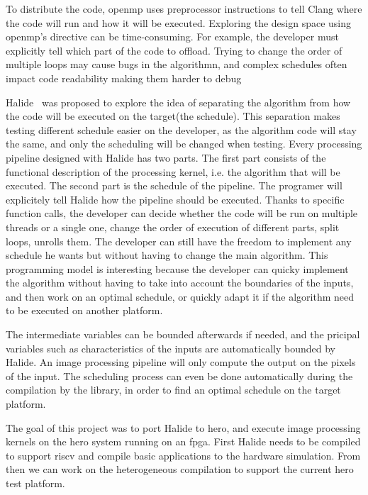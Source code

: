     To distribute the code, \gls{openmp} uses preprocessor instructions to tell Clang where the code will run and how it will be executed. Exploring the design space using \gls{openmp}'s directive can be time-consuming. For example, the developer must explicitly tell which part of the code to offload. Trying to change the order of multiple loops may cause bugs in the algorithmn, and complex schedules often impact code readability making them harder to debug

    Halide~\cite{Art:Halide} was proposed to explore the idea of separating the algorithm from how the code will be executed on the target(the schedule).
    This separation makes testing different schedule easier on the developer, as the algorithm code will stay the same, and only the scheduling will be changed when testing.
    Every processing pipeline designed with Halide has two parts. The first part consists of the functional description of the processing kernel, i.e. the algorithm that will be executed. 
	The second part is the schedule of the pipeline. The programer will explicitely tell Halide how the pipeline should be executed. Thanks to specific function calls, the developer can decide whether the code will be run on multiple threads or a single one, change the order of execution of different parts, split loops, unrolls them. The developer can still have the freedom to implement any schedule he wants but without having to change the main algorithm.
    This programming model is interesting because the developer can quicky implement the algorithm without having to take into account the boundaries of the inputs, and then work on an optimal schedule, or quickly adapt it if the algorithm need to be executed on another platform.

    The intermediate variables can be bounded afterwards if needed, and the pricipal variables such as characteristics of the inputs are automatically bounded by Halide. An image processing pipeline will only compute the output on the pixels of the input.
    The scheduling process can even be done automatically during the compilation by the library, in order to find an optimal schedule on the target platform.

	The goal of this project was to port Halide to \gls{hero}, and execute image processing kernels on the \gls{hero} system running on an \gls{fpga}. First Halide needs to be compiled to support \gls{riscv} and compile basic applications to the hardware simulation. From then we can work on the heterogeneous compilation to support the current \gls{hero} test platform.

